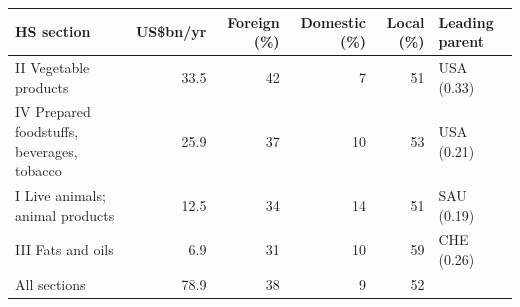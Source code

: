 \begin{tabular}{@{}p{7.2cm} r r r r l@{}}
\toprule
HS section & US\$bn/yr & Foreign (\%) & Domestic (\%) & Local (\%) & Leading parent \\
\midrule
II Vegetable products & 33.5 & 42 & 7 & 51 & USA (0.33) \\
IV Prepared foodstuffs, beverages, tobacco & 25.9 & 37 & 10 & 53 & USA (0.21) \\
I Live animals; animal products & 12.5 & 34 & 14 & 51 & SAU (0.19) \\
III Fats and oils & 6.9 & 31 & 10 & 59 & CHE (0.26) \\
\midrule
All sections & 78.9 & 38 & 9 & 52 & \\
\bottomrule
\end{tabular}
